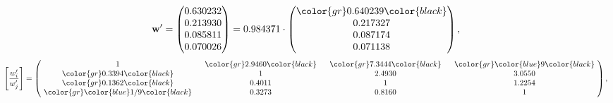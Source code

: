 \begin{example}
\begin{equation*}
\mathbf{w}^{\prime} =
\begin{pmatrix}
0.630232\\
0.213930\\
0.085811\\
0.070026
\end{pmatrix} =
0.984371\cdot
\begin{pmatrix}
\color{gr} 0.640239\color{black} \\
0.217327\\
0.087174\\
0.071138
\end{pmatrix},
\end{equation*}
\begin{equation*}
\left[ \frac{{w}^{\prime}_i}{{w}^{\prime}_j} \right] =
\begin{pmatrix}
$\,\,$ 1 $\,\,$ & $\,\,$\color{gr} 2.9460\color{black} $\,\,$ & $\,\,$\color{gr} 7.3444\color{black} $\,\,$ & $\,\,$\color{gr} \color{blue} 9\color{black} $\,\,$ \\
$\,\,$\color{gr} 0.3394\color{black} $\,\,$ & $\,\,$ 1 $\,\,$ & $\,\,$2.4930$\,\,$ & $\,\,$3.0550  $\,\,$ \\
$\,\,$\color{gr} 0.1362\color{black} $\,\,$ & $\,\,$0.4011$\,\,$ & $\,\,$ 1 $\,\,$ & $\,\,$1.2254 $\,\,$ \\
$\,\,$\color{gr} \color{blue}  1/9\color{black} $\,\,$ & $\,\,$0.3273$\,\,$ & $\,\,$0.8160$\,\,$ & $\,\,$ 1  $\,\,$ \\
\end{pmatrix},
\end{equation*}
\end{example}
\newpage
